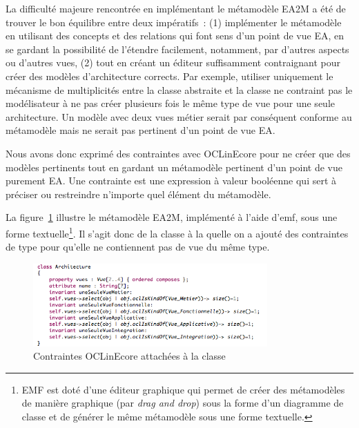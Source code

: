     La difficulté majeure rencontrée en implémentant le métamodèle EA2M a été de
    trouver le bon équilibre entre deux impératifs~: (1) implémenter le
    métamodèle en utilisant des concepts et des relations qui font sens d'un
    point de vue EA, en se gardant la possibilité de l'étendre facilement,
    notamment, par d'autres aspects ou d'autres vues, (2) tout en créant un
    éditeur suffisamment contraignant pour créer des modèles d'architecture
    corrects. Par exemple, utiliser uniquement le mécanisme de multiplicités
    entre la classe abstraite  et la classe  ne contraint
    pas le modélisateur à ne pas créer plusieurs fois le même type de vue pour
    une seule architecture. Un modèle avec deux vues métier serait par
    conséquent conforme au métamodèle mais ne serait pas pertinent d'un point de
    vue EA.

    Nous avons donc exprimé des contraintes avec OCLinEcore pour ne créer que
    des modèles pertinents tout en gardant un métamodèle pertinent d'un point de
    vue purement EA.  Une contrainte est une expression à valeur booléenne qui
    sert à préciser ou restreindre n'importe quel élément du métamodèle.

    La figure~\ref{fig:contraintes_ocl_architecture} illustre le métamodèle
    EA2M, implémenté à l'aide d'\gls{emf}, sous une forme textuelle\footnote{EMF
    est doté d'une éditeur graphique qui permet de créer des métamodèles de
    manière graphique (par \emph{drag and drop}) sous la forme d'un diagramme de
    classe et de générer le même métamodèle sous une forme textuelle.}. Il
    s'agit donc de la classe  à la quelle on a ajouté des
    contraintes de type  pour qu'elle ne contiennent pas de vue du
    même type.

    \begin{figure}[!htbp]
     \begin{center}
      \includegraphics[width=0.8\textwidth]{figures/5_implementation/ocl_in_ecore_vue.png}
     \end{center}
     \caption{Contraintes OCLinEcore attachées à la classe \protect{} }
     \label{fig:contraintes_ocl_architecture}
    \end{figure}

